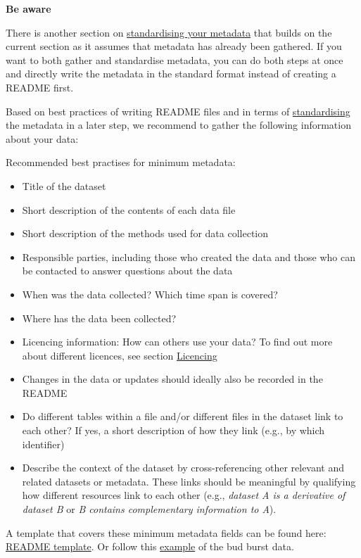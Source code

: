 \documentclass[
]{book}
\begin{document}
{\textbf{Be aware}}

There is another section on \protect\hyperlink{standardise-and-structure-your-metadata}{standardising your metadata} that builds on the current section as it assumes that metadata has already been gathered. If you want to both gather and standardise metadata, you can do both steps at once and directly write the metadata in the standard format instead of creating a README first.

Based on best practices of writing README files and in terms of \protect\hyperlink{standardise}{standardising} the metadata in a later step, we recommend to gather the following information about your data:

Recommended best practises for minimum metadata:

\begin{itemize}
\item
  Title of the dataset
\item
  Short description of the contents of each data file
\item
  Short description of the methods used for data collection
\item
  Responsible parties, including those who created the data and those who can be contacted to answer questions about the data
\item
  When was the data collected? Which time span is covered?
\item
  Where has the data been collected?
\item
  Licencing information: How can others use your data? To find out more about different licences, see section \protect\hyperlink{Licencing}{Licencing}
\item
  Changes in the data or updates should ideally also be recorded in the README
\item
  Do different tables within a file and/or different files in the dataset link to each other? If yes, a short description of how they link (e.g., by which identifier)
\item
  Describe the context of the dataset by cross-referencing other relevant and related datasets or metadata. These links should be meaningful by qualifying how different resources link to each other (e.g., \emph{dataset A is a derivative of dataset B} or \emph{B contains complementary information to A}).
\end{itemize}

A template that covers these minimum metadata fields can be found here: \href{https://github.com/LTER-LIFE/FDFDT/blob/main/readme-templates/README-template.md}{README template}. Or follow this \href{https://github.com/LTER-LIFE/FDFDT/blob/main/readme-templates/README-example-budburst.md}{example} of the bud burst data.
\end{document}
